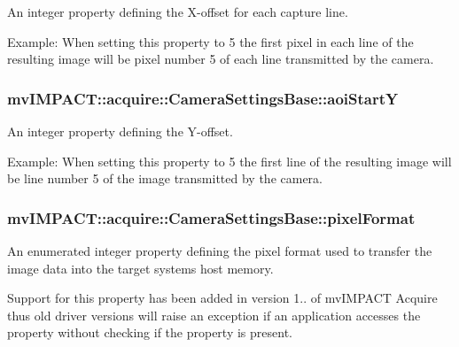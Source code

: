 An integer property defining the X-\/offset for each capture line. 

Example\+: When setting this property to 5 the first pixel in each line of the resulting image will be pixel number 5 of each line transmitted by the camera. \hypertarget{classmv_i_m_p_a_c_t_1_1acquire_1_1_camera_settings_base_a848ee514681ffe6bf617cf6de0bf5a48}{
\subsubsection[{aoi\+Start\+Y}]{ mv\+I\+M\+P\+A\+C\+T\+::acquire\+::\+Camera\+Settings\+Base\+::aoi\+Start\+Y}}\label{classmv_i_m_p_a_c_t_1_1acquire_1_1_camera_settings_base_a848ee514681ffe6bf617cf6de0bf5a48}


An integer property defining the Y-\/offset. 

Example\+: When setting this property to 5 the first line of the resulting image will be line number 5 of the image transmitted by the camera. \hypertarget{classmv_i_m_p_a_c_t_1_1acquire_1_1_camera_settings_base_af295aa670e45c6cbdb6e5d8517922371}{
\subsubsection[{pixel\+Format}]{ mv\+I\+M\+P\+A\+C\+T\+::acquire\+::\+Camera\+Settings\+Base\+::pixel\+Format}}\label{classmv_i_m_p_a_c_t_1_1acquire_1_1_camera_settings_base_af295aa670e45c6cbdb6e5d8517922371}


An enumerated integer property defining the pixel format used to transfer the image data into the target systems host memory. 

Support for this property has been added in version 1.. of mv\+I\+M\+P\+A\+C\+T Acquire thus old driver versions will raise an exception if an application accesses the property without checking if the property is present.

